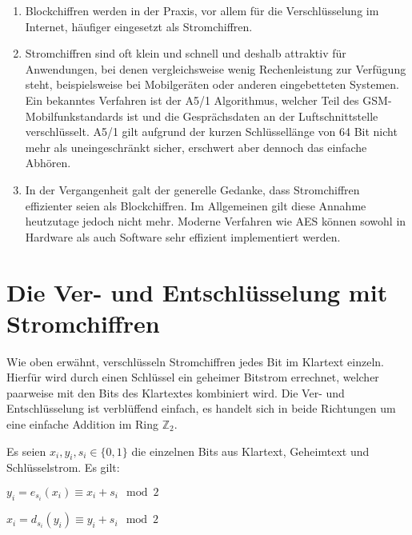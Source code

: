 \begin{enumerate}[itemsep = 0pt]
  \item Blockchiffren werden in der Praxis, vor allem für die Verschlüsselung im Internet,
        häufiger eingesetzt als Stromchiffren.
  \item Stromchiffren sind oft klein und schnell und deshalb attraktiv für Anwendungen,
        bei denen vergleichsweise wenig Rechenleistung zur Verfügung steht, beispielsweise bei
        Mobilgeräten oder anderen eingebetteten Systemen. Ein bekanntes Verfahren ist der
        A5/1 Algorithmus, welcher Teil des GSM-Mobilfunkstandards ist und die Gesprächsdaten
        an der Luftschnittstelle verschlüsselt. A5/1 gilt aufgrund der kurzen Schlüssellänge von
        64 Bit nicht mehr als uneingeschränkt sicher, erschwert aber dennoch das einfache Abhören.
  \item In der Vergangenheit galt der generelle Gedanke, dass Stromchiffren
        effizienter seien als Blockchiffren.
        Im Allgemeinen gilt diese Annahme heutzutage jedoch nicht mehr. Moderne Verfahren wie AES
        können sowohl in Hardware als auch Software sehr effizient implementiert werden.
\end{enumerate}

\newpage
\section{Die Ver- und Entschlüsselung mit Stromchiffren}
Wie oben erwähnt, verschlüsseln Stromchiffren jedes Bit im Klartext einzeln. Hierfür
wird durch einen Schlüssel ein geheimer Bitstrom errechnet, welcher paarweise mit den Bits
des Klartextes kombiniert wird. Die Ver- und Entschlüsselung ist verblüffend einfach, es handelt
sich in beide Richtungen um eine einfache Addition im Ring $\mathbb{Z}_2$.

\begin{definition}
  Es seien $x_i,y_i,s_i \in \{0,1\}$ die einzelnen Bits aus Klartext, Geheimtext und Schlüs\-selstrom.
  Es gilt:
  \begin{description}[itemsep = 0pt]
    \item[Verschlüsselung:] $y_i = e_{s_i}(x_i) \equiv x_i + s_i \mod{2}$
    \item[Entschlüsselung:] $x_i = d_{s_i}(y_i) \equiv y_i + s_i \mod{2}$
  \end{description}
\end{definition}

